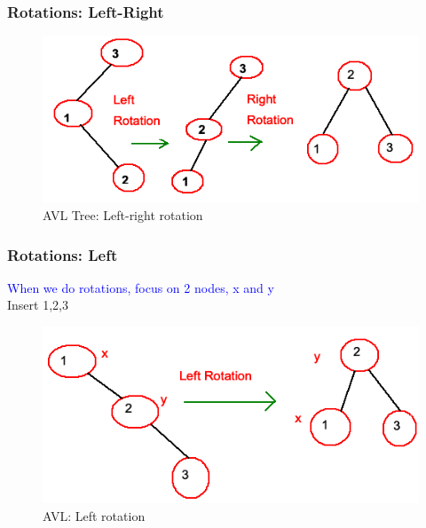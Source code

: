 \documentclass[11pt]{beamer}
\begin{document}
        \begin{frame}
 	\frametitle{Rotations: Left-Right}
    \begin{figure}
    	\centering
    	\includegraphics[width=1\linewidth]{"Screenshot 2020-11-24 at 11.20.53 AM"}
    	\caption{AVL Tree: Left-right rotation}
    	\label{fig:screenshot-2020-11-24-at-11}
    \end{figure}    
 \end{frame}

 \begin{frame}
	\frametitle{Rotations: Left}
	\textcolor{blue}{When we do rotations, focus on 2 nodes, x and y}\\
	\alert{Insert 1,2,3}
	\begin{figure}
		\centering
		\includegraphics[width=1\linewidth]{"Screenshot 2020-11-24 at 11.32.22 AM"}
		\caption{AVL: Left rotation}
		\label{fig:screenshot-2020-11-24-at-11}
	\end{figure}	
\end{frame}	
\end{document}
